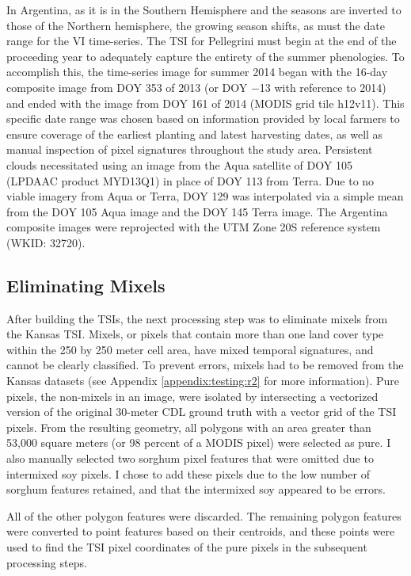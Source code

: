 In Argentina, as it is in the Southern Hemisphere and the seasons are inverted to those of the Northern hemisphere, the growing season shifts, as must the date range for the VI time-series. The TSI for Pellegrini must begin at the end of the proceeding year to adequately capture the entirety of the summer phenologies. To accomplish this, the time-series image for summer 2014 began with the 16-day composite image from DOY 353 of 2013 (or DOY −13 with reference to 2014) and ended with the image from DOY 161 of 2014 (MODIS grid tile h12v11). This specific date range was chosen based on information provided by local farmers to ensure coverage of the earliest planting and latest harvesting dates, as well as manual inspection of pixel signatures throughout the study area. Persistent clouds necessitated using an image from the Aqua satellite of DOY 105 (LPDAAC product MYD13Q1) in place of DOY 113 from Terra. Due to no viable imagery from Aqua or Terra, DOY 129 was interpolated via a simple mean from the DOY 105 Aqua image and the DOY 145 Terra image. The Argentina composite images were reprojected with the UTM Zone 20S reference system (WKID: 32720).

\subsection{Eliminating Mixels}

After building the TSIs, the next processing step was to eliminate mixels from the Kansas TSI. Mixels, or pixels that contain more than one land cover type within the 250 by 250 meter cell area, have mixed temporal signatures, and cannot be clearly classified. To prevent errors, mixels had to be removed from the Kansas datasets (see Appendix \ref{appendix:testing:r2} for more information). Pure pixels, the non-mixels in an image, were isolated by intersecting a vectorized version of the original 30-meter CDL ground truth with a vector grid of the TSI pixels. From the resulting geometry, all polygons with an area greater than 53,000 square meters (or 98 percent of a MODIS pixel) were selected as pure. I also manually selected two sorghum pixel features that were omitted due to intermixed soy pixels. I chose to add these pixels due to the low number of sorghum features retained, and that the intermixed soy appeared to be errors.

All of the other polygon features were discarded. The remaining polygon features were converted to point features based on their centroids, and these points were used to find the TSI pixel coordinates of the pure pixels in the subsequent processing steps. 

